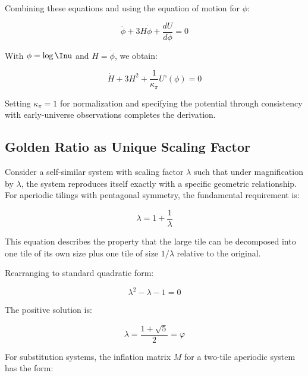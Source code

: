Combining these equations and using the equation of motion for $\phi$:

\begin{equation}
\ddot{\phi} + 3H\dot{\phi} + \frac{dU}{d\phi} = 0
\label{eq:phi-equation}
\end{equation}

With $\phi = \log \Inu$ and $H = \dot{\phi}$, we obtain:

\begin{equation}
\dot{H} + 3H^2 + \frac{1}{\kappa_\pi} U’(\phi) = 0
\label{eq:modified-friedmann-derived}
\end{equation}

Setting $\kappa_\pi = 1$ for normalization and specifying the potential through consistency with early-universe observations completes the derivation.

\subsection{Golden Ratio as Unique Scaling Factor}
\label{subsec:golden-ratio-derivation}

Consider a self-similar system with scaling factor $\lambda$ such that under magnification by $\lambda$, the system reproduces itself exactly with a specific geometric relationship. For aperiodic tilings with pentagonal symmetry, the fundamental requirement is:

\begin{equation}
\lambda = 1 + \frac{1}{\lambda}
\label{eq:self-similarity-condition}
\end{equation}

This equation describes the property that the large tile can be decomposed into one tile of its own size plus one tile of size $1/\lambda$ relative to the original.

Rearranging to standard quadratic form:

\begin{equation}
\lambda^2 - \lambda - 1 = 0
\label{eq:golden-ratio-quadratic}
\end{equation}

The positive solution is:

\begin{equation}
\lambda = \frac{1 + \sqrt{5}}{2} = \varphi
\label{eq:golden-ratio-solution}
\end{equation}

For substitution systems, the inflation matrix $M$ for a two-tile aperiodic system has the form:

